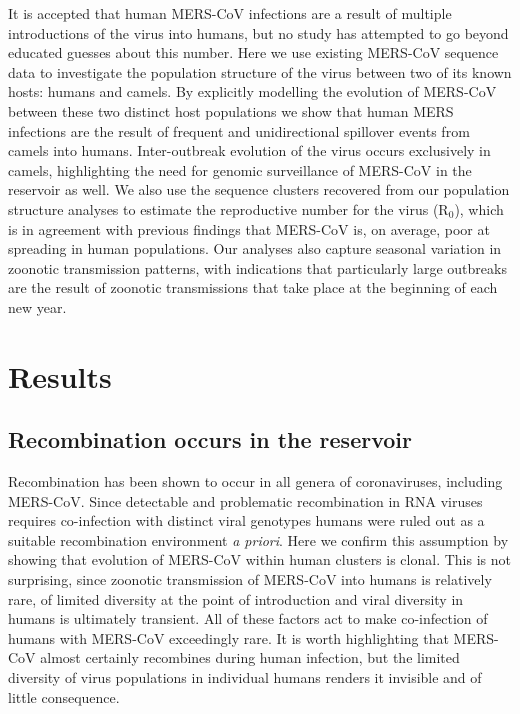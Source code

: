 \documentclass[11pt,oneside,letterpaper]{article}
\begin{document}
It is accepted that human MERS-CoV infections are a result of multiple introductions of the virus into humans, but no study has attempted to go beyond educated guesses about this number.
Here we use existing MERS-CoV sequence data to investigate the population structure of the virus between two of its known hosts: humans and camels.
By explicitly modelling the evolution of MERS-CoV between these two distinct host populations we show that human MERS infections are the result of frequent and unidirectional spillover events from camels into humans.
Inter-outbreak evolution of the virus occurs exclusively in camels, highlighting the need for genomic surveillance of MERS-CoV in the reservoir as well.
We also use the sequence clusters recovered from our population structure analyses to estimate the reproductive number for the virus (R$_{0}$), which is in agreement with previous findings that MERS-CoV is, on average, poor at spreading in human populations.
Our analyses also capture seasonal variation in zoonotic transmission patterns, with indications that particularly large outbreaks are the result of zoonotic transmissions that take place at the beginning of each new year.



%	

\section*{Results}

\subsection*{Recombination occurs in the reservoir}
Recombination has been shown to occur in all genera of coronaviruses, including MERS-CoV.
Since detectable and problematic recombination in RNA viruses requires co-infection with distinct viral genotypes humans were ruled out as a suitable recombination environment \textit{a priori}.
Here we confirm this assumption by showing that evolution of MERS-CoV within human clusters is clonal.
This is not surprising, since zoonotic transmission of MERS-CoV into humans is relatively rare, of limited diversity at the point of introduction and viral diversity in humans is ultimately transient.
All of these factors act to make co-infection of humans with MERS-CoV exceedingly rare.
It is worth highlighting that MERS-CoV almost certainly recombines during human infection, but the limited diversity of virus populations in individual humans renders it invisible and of little consequence.
\end{document}

